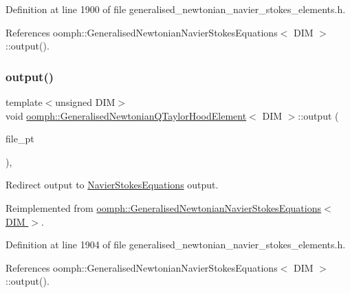 Definition at line 1900 of file generalised\+\_\+newtonian\+\_\+navier\+\_\+stokes\+\_\+elements.\+h.



References oomph\+::\+Generalised\+Newtonian\+Navier\+Stokes\+Equations$<$ D\+I\+M $>$\+::output().

\mbox{\label{classoomph_1_1GeneralisedNewtonianQTaylorHoodElement_ab0d6408d32a068798cdb404db5daadad}} 
\subsubsection{\texorpdfstring{output()}{output()}\hspace{0.1cm}{\footnotesize\ttfamily [3/4]}}
{\footnotesize\ttfamily template$<$unsigned D\+IM$>$ \\
void \hyperlink{classoomph_1_1GeneralisedNewtonianQTaylorHoodElement}{oomph\+::\+Generalised\+Newtonian\+Q\+Taylor\+Hood\+Element}$<$ D\+IM $>$\+::output (\begin{DoxyParamCaption}\item[{F\+I\+LE $\ast$}]{file\+\_\+pt }\end{DoxyParamCaption})\hspace{0.3cm}{\ttfamily [inline]}, {\ttfamily [virtual]}}



Redirect output to \hyperlink{classoomph_1_1NavierStokesEquations}{Navier\+Stokes\+Equations} output. 



Reimplemented from \hyperlink{classoomph_1_1GeneralisedNewtonianNavierStokesEquations_a0f56934ff2c1092a8e9bc457c93bf8cb}{oomph\+::\+Generalised\+Newtonian\+Navier\+Stokes\+Equations$<$ D\+I\+M $>$}.



Definition at line 1904 of file generalised\+\_\+newtonian\+\_\+navier\+\_\+stokes\+\_\+elements.\+h.



References oomph\+::\+Generalised\+Newtonian\+Navier\+Stokes\+Equations$<$ D\+I\+M $>$\+::output().

\mbox{\label{classoomph_1_1GeneralisedNewtonianQTaylorHoodElement_a81288f63a98b7bf60ba3fbd31d1befa7}} 
